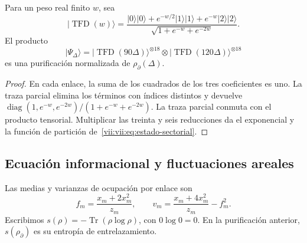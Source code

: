 \begin{proposition}
\label{vii:vii:prop:purificacion-sectorial}
Para un peso real finito \(w\), sea
\begin{equation}
 |\operatorname{TFD}(w)\rangle
 =\frac{|0\rangle|0\rangle+e^{-w/2}|1\rangle|1\rangle
                   +e^{-w}|2\rangle|2\rangle}
        {\sqrt{1+e^{-w}+e^{-2w}}}.
 \label{vii:vii:eq:tfd-local}
\end{equation}
El producto
\begin{equation}
 |\Psi_\Delta\rangle
 =|\operatorname{TFD}(90\Delta)\rangle^{\otimes18}
  \otimes|\operatorname{TFD}(120\Delta)\rangle^{\otimes18}
 \label{vii:vii:eq:tfd-sectorial}
\end{equation}
es una purificación normalizada de \(\rho_\partial(\Delta)\).
\end{proposition}
\begin{proof}
En cada enlace, la suma de los cuadrados de los tres coeficientes es uno.
La traza parcial elimina los términos con índices distintos y devuelve
\(\operatorname{diag}(1,e^{-w},e^{-2w})/(1+e^{-w}+e^{-2w})\).
La traza parcial conmuta con el producto tensorial. Multiplicar las
treinta y seis reducciones da el exponencial y la función de partición
de~\eqref{vii:vii:eq:estado-sectorial}.
\end{proof}

\subsection{Ecuación informacional y fluctuaciones areales}
\label{vii:vii:subsec:ecuacion-informacional}

Las medias y varianzas de ocupación por enlace son
\begin{equation}
 f_m=\frac{x_m+2x_m^2}{z_m},\qquad
 v_m=\frac{x_m+4x_m^2}{z_m}-f_m^2.
 \label{vii:vii:eq:momentos-sectoriales}
\end{equation}
Escribimos \(s(\rho)=-\operatorname{Tr}(\rho\log\rho)\), con
\(0\log0=0\). En la purificación anterior, \(s(\rho_\partial)\)
es su entropía de entrelazamiento.

